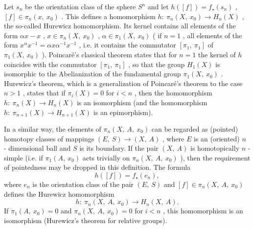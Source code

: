 Let $  s _{n} $ 
be the orientation class of the sphere $  S ^{n} $ 
and let $  h ( [ f ] ) = f _ \star  ( s _{n} ) $ , 
$  [ f ] \in \pi _{n} ( x ,\  x _{0} ) $ . 
This defines a homomorphism $  h : \  \pi _{n} ( X ,\  x _{0} ) \rightarrow H _{n} ( X ) $ , 
the so-called Hurewicz homomorphism. Its kernel contains all elements of the form $  \alpha x - x $ , 
$  x \in \pi _{n} ( X ,\  x _{0} ) $ , 
$  \alpha \in \pi _{1} ( X ,\  x _{0} ) $ (
if $  n = 1 $ , 
all elements of the form $  x ^ \alpha  x ^{-1} = \alpha x \alpha ^{-1} x ^{-1} $ , 
i.e. it contains the commutator $  [ \pi _{1} ,\  \pi _{1} ] $ 
of $  \pi _{1} ( X ,\  x _{0} ) $ ). 
Poincaré's classical theorem states that for $  n = 1 $ 
the kernel of $  h $ 
coincides with the commutator $  [ \pi _{1} ,\  \pi _{1} ] $ , 
so that the group $  H _{1} (X) $ 
is isomorphic to the Abelianization of the fundamental group $  \pi _{1} ( X ,\  x _{0} ) $ . 
Hurewicz's theorem, which is a generalization of Poincaré's theorem to the case $  n > 1 $ , 
states that if $  \pi _{i} (X) = 0 $ 
for $  i < n $ , 
then the homomorphism $  h : \  \pi _{n} (X) \rightarrow H _{n} (X) $ 
is an isomorphism (and the homomorphism $  h : \  \pi _{n+1} (X) \rightarrow H _{n+1} (X) $ 
is an epimorphism).

In a similar way, the elements of $  \pi _{n} ( X ,\  A ,\  x _{0} ) $ 
can be regarded as (pointed) homotopy classes of mappings $  ( E ,\  S ) \rightarrow ( X ,\  A ) $ , 
where $  E $ 
is an (oriented) $  n $ -
dimensional ball and $  S $ 
is its boundary. If the pair $  ( X ,\  A ) $ 
is homotopically $  n $ -
simple (i.e. if $  \pi _{1} ( A ,\  x _{0} ) $ 
acts trivially on $  \pi _{n} ( X ,\  A ,\  x _{0} ) $ ), 
then the requirement of pointedness may be dropped in this definition. The formula$$ 
h ( [ f ] )   =   f _ \star  ( e _{n} ) ,
 $$ 
where $  e _{n} $ 
is the orientation class of the pair $  ( E ,\  S ) $ 
and $  [ f ] \in \pi _{n} ( X ,\  A ,\  x _{0} ) $ 
defines the Hurewicz homomorphism$$ 
h : \  \pi _{n} ( X ,\  A ,\  x _{0} )   \rightarrow  
H _{n} ( X ,\  A ) .
 $$ 
If $  \pi _{1} ( A ,\  x _{0} ) = 0 $ 
and $  \pi _{n} ( X ,\  A ,\  x _{0} ) = 0 $ 
for $  i < n $ , 
this homomorphism is an isomorphism (Hurewicz's theorem for relative groups).

